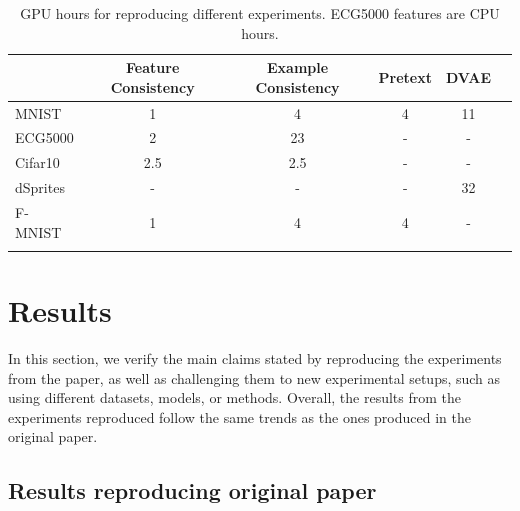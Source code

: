 \begin{table}[H]
\centering
\small
\begin{tabular}{lccccc}
\firsthline
\centering
 & Feature Consistency & Example Consistency & Pretext & DVAE \\ 
 \hline
MNIST     & 1 & 4 & 4 & 11 \\
ECG5000   & 2 & 23 & - & - \\
Cifar10   & 2.5 & 2.5 & - & - \\
dSprites & - & - & - & 32 \\ 
F-MNIST & 1 & 4 & 4 & - \\ 
\lasthline
\end{tabular}
\caption{\label{table-runtime}GPU hours for reproducing different experiments. ECG5000 features are CPU hours.}
\end{table}


\section{Results}
\label{sec:results}


In this section, we verify the main claims stated by reproducing the experiments from the paper, as well as challenging them to new experimental setups, such as using different datasets, models, or methods. Overall, the results from the experiments reproduced follow the same trends as the ones produced in the original paper.

\subsection{Results reproducing original paper} \label{section41}


